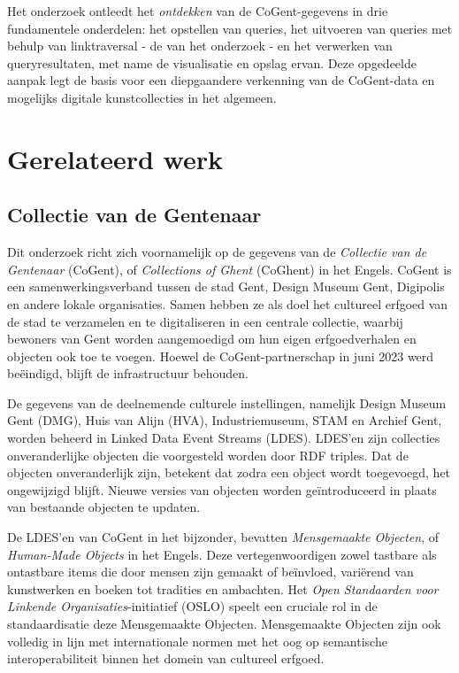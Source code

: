 \documentclass[conference]{IEEEtran}
\begin{document}
Het onderzoek ontleedt het \textit{ontdekken} van de CoGent-gegevens in drie fundamentele onderdelen: het opstellen van queries, het uitvoeren van queries met behulp van linktraversal - de van het onderzoek - en het verwerken van queryresultaten, met name de visualisatie en opslag ervan. Deze opgedeelde aanpak legt de basis voor een diepgaandere verkenning van de CoGent-data en mogelijks digitale kunstcollecties in het algemeen.

\section{Gerelateerd werk}

\subsection{Collectie van de Gentenaar}
Dit onderzoek richt zich voornamelijk op de gegevens van de \textit{Collectie van de Gentenaar} (CoGent), of \textit{Collections of Ghent} (CoGhent) in het Engels. CoGent is een samenwerkingsverband tussen de stad Gent, Design Museum Gent, Digipolis en andere lokale organisaties. Samen hebben ze als doel het cultureel erfgoed van de stad te verzamelen en te digitaliseren in een centrale collectie, waarbij bewoners van Gent worden aangemoedigd om hun eigen erfgoedverhalen en objecten ook toe te voegen. Hoewel de CoGent-partnerschap in juni 2023 werd beëindigd, blijft de infrastructuur behouden. \cite{leemputten2022gent} \cite{schouppe2022gent}

De gegevens van de deelnemende culturele instellingen, namelijk Design Museum Gent (DMG), Huis van Alijn (HVA), Industriemuseum, STAM en Archief Gent, worden beheerd in Linked Data Event Streams (LDES). LDES'en zijn collecties onveranderlijke objecten die voorgesteld worden door RDF triples. Dat de objecten onveranderlijk zijn, betekent dat zodra een object wordt toegevoegd, het ongewijzigd blijft. Nieuwe versies van objecten worden geïntroduceerd in plaats van bestaande objecten te updaten. \cite{floreverk2022coghent} \cite{colpaert2023ldes}

De LDES'en van CoGent in het bijzonder, bevatten \textit{Mensgemaakte Objecten}, of \textit{Human-Made Objects} in het Engels. Deze vertegenwoordigen zowel tastbare als ontastbare items die door mensen zijn gemaakt of beïnvloed, variërend van kunstwerken en boeken tot tradities en ambachten. Het \textit{Open Standaarden voor Linkende Organisaties}-initiatief (OSLO) speelt een cruciale rol in de standaardisatie deze Mensgemaakte Objecten. Mensgemaakte Objecten zijn ook volledig in lijn met internationale normen met het oog op semantische interoperabiliteit binnen het domein van cultureel erfgoed. \cite{van2022publishing} \cite{vanderperren2021oslo}
\end{document}
